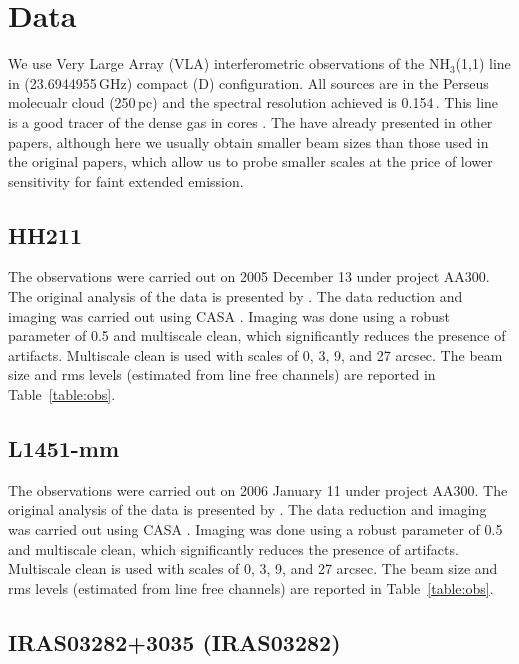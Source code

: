 \section{Data}

We use Very Large Array (VLA) interferometric observations of the NH$_3$(1,1) line in (23.6944955\,GHz)
compact (D) configuration. 
All sources are in the Perseus molecualr cloud (250\,pc) and the spectral resolution achieved is 0.154\,\kms. 
This line is a good tracer of the dense gas in cores \cite{Benson_1989,Goodman_1998,Tafalla_2004,Pineda_2010}.
The have already presented in other papers, although here we usually obtain smaller beam sizes than those 
used in the original papers, which allow us to probe smaller scales at the 
price of lower sensitivity for faint extended emission.

\subsection{HH211}
The observations were carried out on 2005 December 13 under project AA300. 
The original analysis of the data is presented by \cite{Tanner_2010}.
The data reduction and imaging was carried out using CASA \cite{2007ASPC..376..127M}. 
Imaging was done using a robust parameter of 0.5 and multiscale clean, which significantly reduces 
the presence of artifacts. 
Multiscale clean is used with scales of 0, 3, 9, and 27 arcsec. 
The beam size and rms levels (estimated from line free channels) are reported in Table~\ref{table:obs}.

\subsection{L1451-mm}
The observations were carried out on 2006 January 11 under project AA300. 
The original analysis of the data is presented by \cite{Pineda_2011}.
The data reduction and imaging was carried out using CASA \cite{2007ASPC..376..127M}. 
Imaging was done using a robust parameter of 0.5 and multiscale clean, which significantly reduces 
the presence of artifacts. 
Multiscale clean is used with scales of 0, 3, 9, and 27 arcsec. 
The beam size and rms levels (estimated from line free channels) are reported in Table~\ref{table:obs}.



\subsection{IRAS03282+3035 (IRAS03282)}

